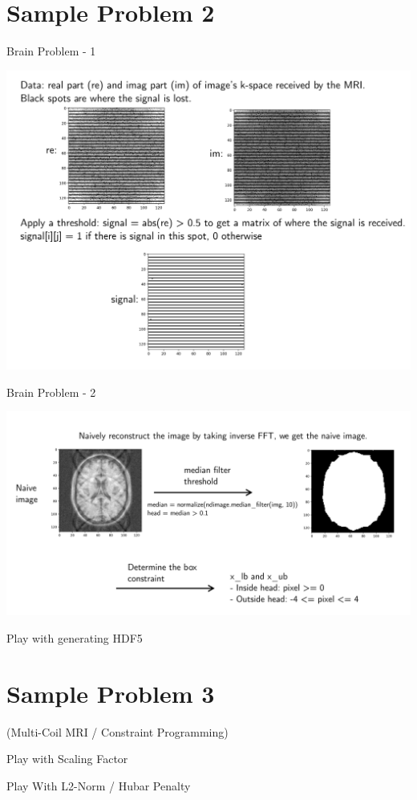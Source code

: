 \documentclass[presentation]{beamer}
\begin{document}
\section{Sample Problem 2}
\label{sec:org0fb732f}
\begin{frame}[label={sec:org0ee1152}]{Brain Problem - 1}
\begin{center}
\includegraphics[width=.9\linewidth]{figs/MRIBrain1.pdf}
\end{center}
\end{frame}
\begin{frame}[label={sec:org2a77819}]{Brain Problem - 2}
\begin{center}
\includegraphics[width=.9\linewidth]{figs/MRIBrain2.pdf}
\end{center}
\end{frame}
\begin{frame}[label={sec:org744e067}]{Play with generating HDF5}
\end{frame}
\section{Sample Problem 3}
\label{sec:org70855ae}
\begin{frame}[label={sec:orgc46a8f9}]{(Multi-Coil MRI / Constraint Programming)}
\end{frame}
\begin{frame}[label={sec:org1b54230}]{Play with Scaling Factor}
\end{frame}
\begin{frame}[label={sec:orgff6ee47}]{Play With L2-Norm / Hubar Penalty}
\end{frame}
\end{document}

